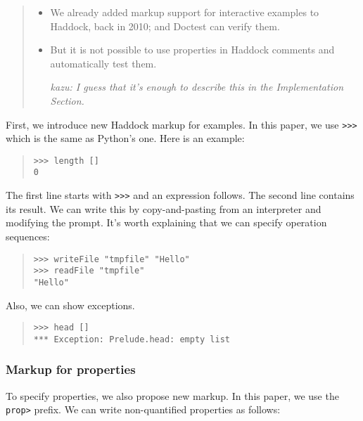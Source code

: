 \documentclass[preprint]{sigplanconf}
\begin{document}
\begin{quote}
\begin{itemize}
    \item
        We already added markup support for interactive examples to
        Haddock, back in 2010; and Doctest can verify them.
    \item
        But it is not possible to use properties in Haddock comments
        and automatically test them.

    \emph{kazu: I guess that it's enough to describe this in the Implementation Section.}
\end{itemize}
\end{quote}

\noindent First, we introduce new Haddock markup for examples.
In this paper, we use {\tt >>>} which is the same as Python's one.
Here is an example:

\begin{quote}
\small
\begin{verbatim}
>>> length []
0
\end{verbatim}
\end{quote}

\noindent The first line starts with {\tt >>>} and an expression follows. The second line contains its result. We can write this by copy-and-pasting from an interpreter and modifying the prompt.
It's worth explaining that we can specify operation sequences:

\begin{quote}
\small
\begin{verbatim}
>>> writeFile "tmpfile" "Hello"
>>> readFile "tmpfile"
"Hello"
\end{verbatim}
\end{quote}

\noindent Also, we can show exceptions.

\begin{quote}
\small
\begin{verbatim}
>>> head []
*** Exception: Prelude.head: empty list
\end{verbatim}
\end{quote}

\subsubsection{Markup for properties}
\label{sec:markups}

\noindent To specify properties, we also propose new markup. In this paper, we
use the {\tt prop>} prefix. We can write non-quantified properties as follows:
\end{document}
